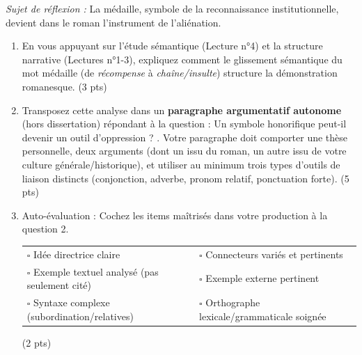 \documentclass[11pt]{article}
\begin{document}
\begin{exercice}
\emph{Sujet de réflexion :} \og La médaille, symbole de la reconnaissance institutionnelle, devient dans le roman l'instrument de l'aliénation. \fg{}

\begin{enumerate}
    \item En vous appuyant sur l'étude sémantique (Lecture n°4) et la structure narrative (Lectures n°1-3), expliquez comment le glissement sémantique du mot \og médaille \fg{} (de \textit{récompense} à \textit{chaîne/insulte}) structure la démonstration romanesque. (3 pts)
    \item Transposez cette analyse dans un \textbf{paragraphe argumentatif autonome} (hors dissertation) répondant à la question : \og Un symbole honorifique peut-il devenir un outil d'oppression ? \fg{}. Votre paragraphe doit comporter une thèse personnelle, deux arguments (dont un issu du roman, un autre issu de votre culture générale/historique), et utiliser au minimum trois types d'outils de liaison distincts (conjonction, adverbe, pronom relatif, ponctuation forte). (5 pts)
    \item Auto-évaluation : Cochez les items maîtrisés dans votre production à la question 2.
    \begin{tabular}{ll}
    $\square$ Idée directrice claire & $\square$ Connecteurs variés et pertinents \\
    $\square$ Exemple textuel analysé (pas seulement cité) & $\square$ Exemple externe pertinent \\
    $\square$ Syntaxe complexe (subordination/relatives) & $\square$ Orthographe lexicale/grammaticale soignée
    \end{tabular}
    (2 pts)
\end{enumerate}
\end{exercice}
\end{document}
